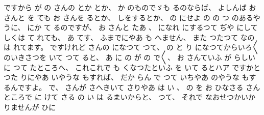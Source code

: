 ですから
が
の
さんの
とか
とか、
%
か
のものでゞも
るのならば、
%
よしんば
お
さんと
を
ても
お
さんを
るとか、
%
しをするとか、
%
の
にせよ
の
の
つ
のあるやうに、
%
にか
て
るのですが、
%
お
さんと
たあ
、
%
になれ
にするつて
ぢや
にして
しくは
て
れても、
%
あ
てす、
%
ふまでにやあ
も
へません、
%
また
つたつて
なのは
れてます。
%
ですけれど
さんの
になつて
つて、
%
の
と
り
になつてからいろ〳〵のいきさつを
いて
つて
ると、
%
あ
に
の
が
の
で〳〵、
%
お
さんていふ
が
らしい
に
つて
たところへ、
%
これこれで
も
くなつたといふ
を
いて
るとハア
ですかと
つた
りにやあ
いやうな
もすれば、
%
だか
らん
で
つて
いちやあ
のやうな
もするんですよ。
%
で、
%
さんが
さへきいて
さりやあ
は
い
、
%
の
を
お
ひなさる
さんところで
に
けて
さる
の
い
は
るまいからと、
%
つて、
%
それで
なおせつかいか
りませんが
ひに
